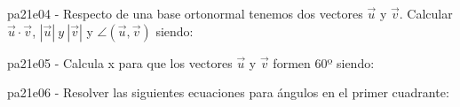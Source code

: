 \documentclass[spanish, 11pt]{exam}
\begin{document}
        \begin{questions}
        \question pa21e04 - Respecto de una base ortonormal tenemos dos vectores $\overrightarrow{u}$ y $\overrightarrow{v}$.
Calcular $\overrightarrow{u}\cdot\overrightarrow{v}$, $|\overrightarrow{u}| \ y \ |\overrightarrow{v}|$ 
y $\angle(\overrightarrow{u},\overrightarrow{v})$ siendo:
        \begin{multicols}{2} 
        \end{multicols}
        \question pa21e05 - Calcula x para que los vectores
$\overrightarrow{u}$ y $\overrightarrow{v}$ formen 60º siendo: 
        \begin{multicols}{2} 
        \end{multicols}
        \question pa21e06 - Resolver las siguientes ecuaciones para ángulos en el primer cuadrante:
        \begin{multicols}{1} 

\end{multicols}
\end{questions}
\end{document}
